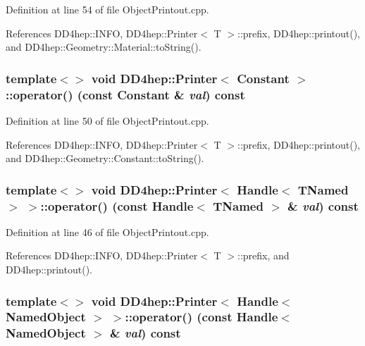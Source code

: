 Definition at line 54 of file ObjectPrintout.cpp.

References DD4hep::INFO, DD4hep::Printer$<$ T $>$::prefix, DD4hep::printout(), and DD4hep::Geometry::Material::toString().\hypertarget{struct_d_d4hep_1_1_printer_af17e77692a1780cd7e9b72f8ef93b305}{
\subsubsection[{operator()}]{\setlength{\rightskip}{0pt plus 5cm}template$<$$>$ void {\bf DD4hep::Printer}$<$ {\bf Constant} $>$::operator() (const {\bf Constant} \& {\em val}) const}}
\label{struct_d_d4hep_1_1_printer_af17e77692a1780cd7e9b72f8ef93b305}


Definition at line 50 of file ObjectPrintout.cpp.

References DD4hep::INFO, DD4hep::Printer$<$ T $>$::prefix, DD4hep::printout(), and DD4hep::Geometry::Constant::toString().\hypertarget{struct_d_d4hep_1_1_printer_aa5a952368672b69afb9dbbc0243798d5}{
\subsubsection[{operator()}]{\setlength{\rightskip}{0pt plus 5cm}template$<$$>$ void {\bf DD4hep::Printer}$<$ {\bf Handle}$<$ {\bf TNamed} $>$ $>$::operator() (const {\bf Handle}$<$ {\bf TNamed} $>$ \& {\em val}) const}}
\label{struct_d_d4hep_1_1_printer_aa5a952368672b69afb9dbbc0243798d5}


Definition at line 46 of file ObjectPrintout.cpp.

References DD4hep::INFO, DD4hep::Printer$<$ T $>$::prefix, and DD4hep::printout().\hypertarget{struct_d_d4hep_1_1_printer_afe43814cba7a5a64dc550b7b9be43a81}{
\subsubsection[{operator()}]{\setlength{\rightskip}{0pt plus 5cm}template$<$$>$ void {\bf DD4hep::Printer}$<$ {\bf Handle}$<$ {\bf NamedObject} $>$ $>$::operator() (const {\bf Handle}$<$ {\bf NamedObject} $>$ \& {\em val}) const}}
\label{struct_d_d4hep_1_1_printer_afe43814cba7a5a64dc550b7b9be43a81}


